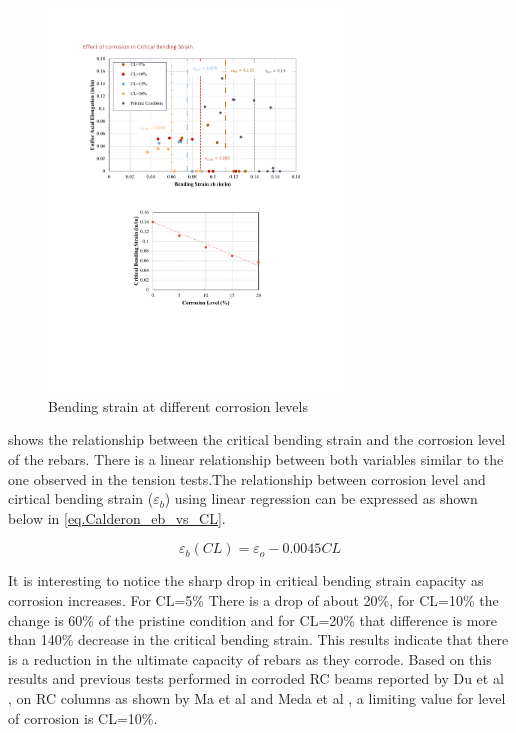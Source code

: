 \begin{figure}[htbp]
	\centering
	\includegraphics[width=0.7\textwidth]{VAC Thesis 2.0/Chapter-4/figs/BBT_results_.pdf}
	\caption{Bending strain at different corrosion levels}
	\label{fig:BBT_strains}
\end{figure}

 shows the relationship between the critical bending strain and the corrosion level of the rebars. There is a linear relationship between both variables similar to the one observed in the tension tests.The relationship between corrosion level and cirtical bending strain ($\varepsilon_{b}$) using linear regression can be expressed as shown below in \ref{eq.Calderon_eb_vs_CL}.

\begin{equation}
    \varepsilon_{b}(CL) = \varepsilon_{o}-0.0045CL
    \label{eq.Calderon_eb_vs_CL}
\end{equation}

It is interesting to notice the sharp drop in critical bending strain capacity as corrosion increases. For CL=5\% There is a drop of about 20\%, for CL=10\% the change is 60\% of the pristine condition and for CL=20\% that difference is more than 140\% decrease in the critical bending strain. This results indicate that there is a reduction in the ultimate capacity of rebars as they corrode. Based on this results and previous tests performed in corroded RC beams reported by Du et al \cite{Du2005}, on RC columns as shown by Ma et al \cite{Ma2012} and Meda et al \cite{Meda2014}, a limiting value for level of corrosion is CL=10\%.

